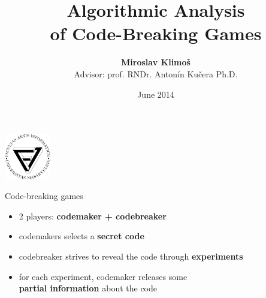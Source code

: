 \documentclass{beamer}
\title{Algorithmic Analysis\\ of Code-Breaking Games}
\author{\textbf{Miroslav Klimoš} \\\medskip Advisor: prof. RNDr. Antonín Kučera Ph.D.}
\date{June 2014}
\begin{document}
\begin{frame}[plain]
\begin{center}
\includegraphics[width=20mm]{logo_fi.pdf}
\end{center}
\vspace{-5mm}
\maketitle
\end{frame}

\begin{frame}{Code-breaking games}
\begin{itemize}\itemsep 10pt
\item 2 players: \textbf{codemaker + codebreaker}
\item codemakers selects a \textbf{secret code}
\item codebreaker strives to reveal the code through \textbf{experiments}
\item for each experiment, codemaker releases some \\\textbf{partial information} about the code
\end{itemize}
\end{frame}
\end{document}
